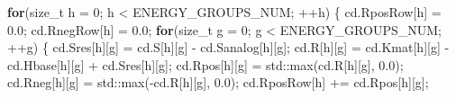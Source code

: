 \documentclass[
]{article}
\newenvironment{Shaded}{}{}
\newcommand{\BuiltInTok}[1]{\textcolor[rgb]{0.00,0.50,0.00}{#1}}
\newcommand{\ControlFlowTok}[1]{\textcolor[rgb]{0.00,0.44,0.13}{\textbf{#1}}}
\newcommand{\DataTypeTok}[1]{\textcolor[rgb]{0.56,0.13,0.00}{#1}}
\newcommand{\DecValTok}[1]{\textcolor[rgb]{0.25,0.63,0.44}{#1}}
\newcommand{\FloatTok}[1]{\textcolor[rgb]{0.25,0.63,0.44}{#1}}
\newcommand{\NormalTok}[1]{#1}
\newcommand{\OperatorTok}[1]{\textcolor[rgb]{0.40,0.40,0.40}{#1}}
\begin{document}
\begin{Shaded}
\begin{Highlighting}[]
\ControlFlowTok{for}\OperatorTok{(}\DataTypeTok{size\_t}\NormalTok{ h }\OperatorTok{=} \DecValTok{0}\OperatorTok{;}\NormalTok{ h }\OperatorTok{\textless{}}\NormalTok{ ENERGY\_GROUPS\_NUM}\OperatorTok{;} \OperatorTok{++}\NormalTok{h}\OperatorTok{)}
\OperatorTok{\{}
\NormalTok{    cd}\OperatorTok{.}\NormalTok{RposRow}\OperatorTok{[}\NormalTok{h}\OperatorTok{]} \OperatorTok{=} \FloatTok{0.0}\OperatorTok{;}
\NormalTok{    cd}\OperatorTok{.}\NormalTok{RnegRow}\OperatorTok{[}\NormalTok{h}\OperatorTok{]} \OperatorTok{=} \FloatTok{0.0}\OperatorTok{;}
    \ControlFlowTok{for}\OperatorTok{(}\DataTypeTok{size\_t}\NormalTok{ g }\OperatorTok{=} \DecValTok{0}\OperatorTok{;}\NormalTok{ g }\OperatorTok{\textless{}}\NormalTok{ ENERGY\_GROUPS\_NUM}\OperatorTok{;} \OperatorTok{++}\NormalTok{g}\OperatorTok{)}
    \OperatorTok{\{}
\NormalTok{        cd}\OperatorTok{.}\NormalTok{Sres}\OperatorTok{[}\NormalTok{h}\OperatorTok{][}\NormalTok{g}\OperatorTok{]} \OperatorTok{=}\NormalTok{ cd}\OperatorTok{.}\NormalTok{S}\OperatorTok{[}\NormalTok{h}\OperatorTok{][}\NormalTok{g}\OperatorTok{]} \OperatorTok{{-}}\NormalTok{ cd}\OperatorTok{.}\NormalTok{Sanalog}\OperatorTok{[}\NormalTok{h}\OperatorTok{][}\NormalTok{g}\OperatorTok{];}
\NormalTok{        cd}\OperatorTok{.}\NormalTok{R}\OperatorTok{[}\NormalTok{h}\OperatorTok{][}\NormalTok{g}\OperatorTok{]} \OperatorTok{=}\NormalTok{ cd}\OperatorTok{.}\NormalTok{Kmat}\OperatorTok{[}\NormalTok{h}\OperatorTok{][}\NormalTok{g}\OperatorTok{]} \OperatorTok{{-}}\NormalTok{ cd}\OperatorTok{.}\NormalTok{Hbase}\OperatorTok{[}\NormalTok{h}\OperatorTok{][}\NormalTok{g}\OperatorTok{]} \OperatorTok{+}\NormalTok{ cd}\OperatorTok{.}\NormalTok{Sres}\OperatorTok{[}\NormalTok{h}\OperatorTok{][}\NormalTok{g}\OperatorTok{];}
\NormalTok{        cd}\OperatorTok{.}\NormalTok{Rpos}\OperatorTok{[}\NormalTok{h}\OperatorTok{][}\NormalTok{g}\OperatorTok{]} \OperatorTok{=} \BuiltInTok{std::}\NormalTok{max}\OperatorTok{(}\NormalTok{cd}\OperatorTok{.}\NormalTok{R}\OperatorTok{[}\NormalTok{h}\OperatorTok{][}\NormalTok{g}\OperatorTok{],} \FloatTok{0.0}\OperatorTok{);}
\NormalTok{        cd}\OperatorTok{.}\NormalTok{Rneg}\OperatorTok{[}\NormalTok{h}\OperatorTok{][}\NormalTok{g}\OperatorTok{]} \OperatorTok{=} \BuiltInTok{std::}\NormalTok{max}\OperatorTok{({-}}\NormalTok{cd}\OperatorTok{.}\NormalTok{R}\OperatorTok{[}\NormalTok{h}\OperatorTok{][}\NormalTok{g}\OperatorTok{],} \FloatTok{0.0}\OperatorTok{);}
\NormalTok{        cd}\OperatorTok{.}\NormalTok{RposRow}\OperatorTok{[}\NormalTok{h}\OperatorTok{]} \OperatorTok{+=}\NormalTok{ cd}\OperatorTok{.}\NormalTok{Rpos}\OperatorTok{[}\NormalTok{h}\OperatorTok{][}\NormalTok{g}\OperatorTok{];}

\end{Highlighting}
\end{Shaded}
\end{document}
